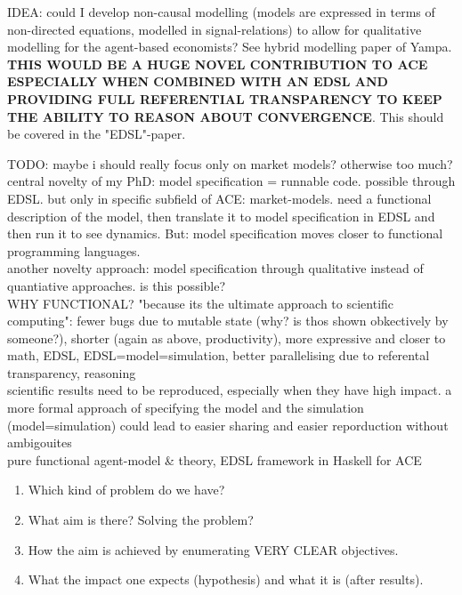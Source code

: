 \documentclass{article}
\begin{document}
IDEA: could I develop non-causal modelling (models are expressed in terms of non-directed equations, modelled in signal-relations) to allow for qualitative modelling for the agent-based economists? See hybrid modelling paper of Yampa. \textbf{THIS WOULD BE A HUGE NOVEL CONTRIBUTION TO ACE ESPECIALLY WHEN COMBINED WITH AN EDSL AND PROVIDING FULL REFERENTIAL TRANSPARENCY TO KEEP THE ABILITY TO REASON ABOUT CONVERGENCE}. This should be covered in the "EDSL"-paper.

TODO: maybe i should really focus only on market models? otherwise too much? \\

central novelty of my PhD: model specification = runnable code. possible through EDSL. but only in specific subfield of ACE: market-models. need a functional description of the model, then translate it to model specification in EDSL and then run it to see dynamics. But: model specification moves closer to functional programming languages. \\

another novelty approach: model specification through qualitative instead of quantiative approaches. is this possible? \\

WHY FUNCTIONAL? "because its the ultimate approach to scientific computing": fewer bugs due to mutable state (why? is thos shown obkectively by someone?), shorter (again as above, productivity), more expressive and closer to math, EDSL, EDSL=model=simulation, better parallelising due to referental transparency, reasoning \\

scientific results need to be reproduced, especially when they have high impact. a more formal approach of specifying the model and the simulation (model=simulation) could lead to easier sharing and easier reporduction without ambigouites \\

pure functional agent-model \& theory, EDSL framework in Haskell for ACE

\begin{enumerate}
\item Which kind of problem do we have?
\item What aim is there? Solving the problem? 
\item How the aim is achieved by enumerating VERY CLEAR objectives.
\item What the impact one expects (hypothesis) and what it is (after results).
\end{enumerate}
\end{document}
